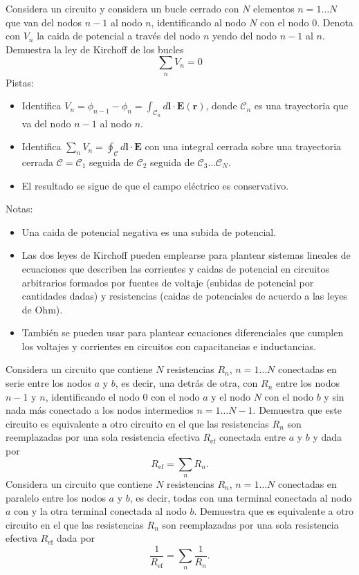 \documentclass{exam}
\begin{document}
\begin{questions}
  \question Considera un circuito y considera un bucle cerrado con $N$
  elementos $n=1\ldots N$ que van del nodos $n-1$ al nodo $n$,
  identificando al nodo $N$ con el nodo $0$. Denota con $V_n$ la caida
  de potencial a través del nodo $n$ yendo del nodo $n-1$ al $n$. Demuestra la ley de Kirchoff de
  los bucles
  $$
  \sum_n V_n=0
  $$
  Pistas:
  \begin{itemize}
  \item Identifica $V_n=\phi_{n-1}-\phi_{n}=\int_{\mathcal C_n}d\bm
    l\cdot\bm E(\bm r)$, donde $\mathcal C_n$ es una trayectoria que
    va del nodo $n-1$ al nodo $n$.
  \item Identifica $\sum_n V_n=\oint_{\mathcal C}d\bm l\cdot\bm E$ con
    una integral cerrada sobre una
    trayectoria cerrada $\mathcal C=\mathcal C_1$ seguida de $\mathcal C_2$  seguida de
    $\mathcal C_3\ldots\mathcal C_N$.
  \item El resultado se sigue de que el campo eléctrico es conservativo.
  \end{itemize}
  Notas:
  \begin{itemize}
  \item Una caida de potencial negativa es una subida de potencial.
  \item Las dos leyes de Kirchoff pueden emplearse para plantear
    sistemas lineales de ecuaciones que describen las corrientes y caidas
    de potencial en circuitos arbitrarios formados por fuentes de
    voltaje (subidas de potencial por cantidades dadas) y resistencias
    (caidas de potenciales de acuerdo a las leyes de Ohm).
  \item También se pueden usar para plantear ecuaciones diferenciales
    que cumplen los voltajes y corrientes en circuitos con
    capacitancias e inductancias.
  \end{itemize}

  \question Considera un circuito que contiene $N$
  resistencias $R_n$, $n=1\ldots N$ conectadas en serie entre los
  nodos $a$ y $b$, es decir, una detrás de
  otra, con $R_n$ entre los nodos $n-1$ y $n$, identificando el nodo
  $0$ con el nodo $a$ y el nodo $N$ con el nodo $b$ y sin nada
  más conectado a los nodos intermedios $n=1\ldots N-1$. Demuestra que
  este circuito es equivalente a otro circuito en el que las resistencias $R_n$
  son reemplazadas por una sola resistencia efectiva $R_{\mathrm{ef}}$
  conectada entre $a$ y $b$ y dada por
  $$
  R_{\mathrm{ef}}=\sum_n R_n.
  $$
  \question Considera un circuito que contiene $N$
  resistencias $R_n$, $n=1\ldots N$ conectadas en paralelo entre los
  nodos $a$ y $b$, es decir, todas con una terminal conectada al nodo
  $a$ con y la otra terminal conectada al nodo $b$. Demuestra
  que es equivalente a otro circuito en el que las resistencias $R_n$
  son reemplazadas por una sola resistencia efectiva $R_{\mathrm{ef}}$
  dada por
  $$
  \frac{1}{R_{\mathrm{ef}}}=\sum_n\frac{1}{R_n}.
  $$


\end{questions}
\end{document}
